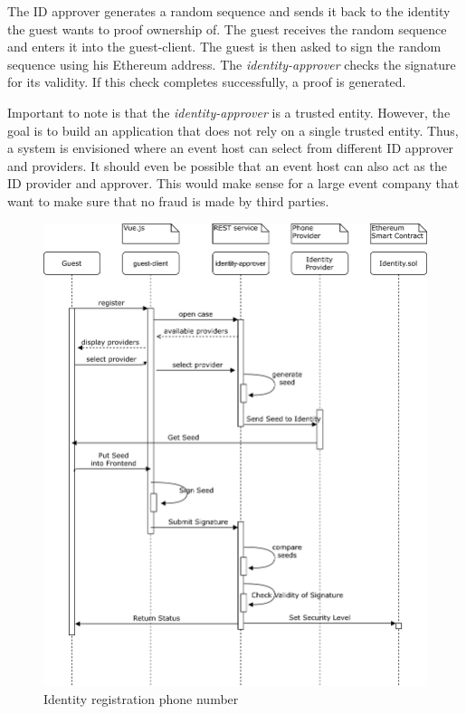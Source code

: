 The ID approver generates a random sequence and sends it back to the identity the guest wants to proof ownership of. The guest receives the random sequence and enters it into the guest-client. The guest is then asked to sign the random sequence using his Ethereum address. The \textit{identity-approver} checks the signature for its validity. If this check completes successfully, a proof is generated.

Important to note is that the \textit{identity-approver} is a trusted entity. However, the goal is to build an application that does not rely on a single trusted entity. Thus, a system is envisioned where an event host can select from different ID approver and providers. It should even be possible that an event host can also act as the ID provider and approver. This would make sense for a large event company that want to make sure that no fraud is made by third parties. 

\begin{figure}[H]
    \centering
    \includegraphics[width=16cm]{design/diagrams/identy-registration-airbnb.png}
    \caption{Identity registration phone number}
    \label{fig:identity-registration-airbnb}
\end{figure}

